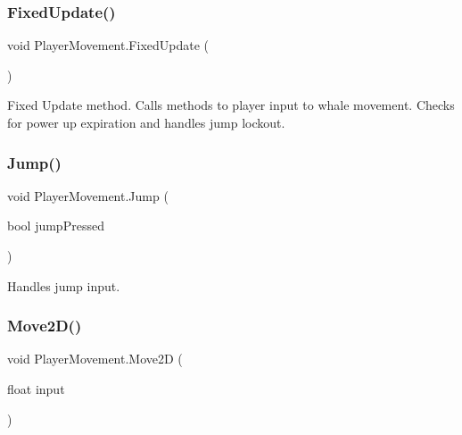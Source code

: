 \mbox{\label{class_player_movement_a0caaa871b9ef680c9f02bd0e22c77db1}} 
\subsubsection{\texorpdfstring{Fixed\+Update()}{FixedUpdate()}}
{\footnotesize\ttfamily void Player\+Movement.\+Fixed\+Update (\begin{DoxyParamCaption}{ }\end{DoxyParamCaption})\hspace{0.3cm}{\ttfamily [private]}}



Fixed Update method. Calls methods to player input to whale movement. Checks for power up expiration and handles jump lockout. 

\mbox{\label{class_player_movement_ae0738f125df9382e2425be64619cbf4a}} 
\subsubsection{\texorpdfstring{Jump()}{Jump()}}
{\footnotesize\ttfamily void Player\+Movement.\+Jump (\begin{DoxyParamCaption}\item[{bool}]{jump\+Pressed }\end{DoxyParamCaption})}



Handles jump input. 

\mbox{\label{class_player_movement_a14a6dd3ffa26d0ccbf484448b5266b79}} 
\subsubsection{\texorpdfstring{Move2\+D()}{Move2D()}}
{\footnotesize\ttfamily void Player\+Movement.\+Move2D (\begin{DoxyParamCaption}\item[{float}]{input }\end{DoxyParamCaption})}



